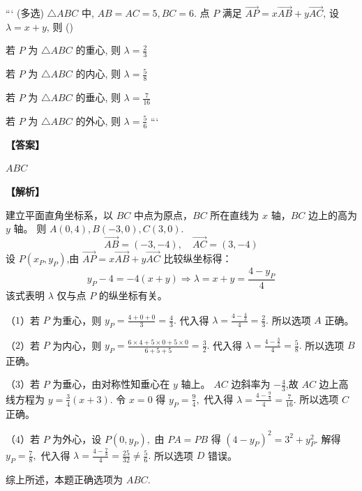 \documentclass{exam-zh}
\newenvironment{answer}{\par\vspace{0.5em}\noindent\textbf{【答案】}\par}{\par\vspace{1em}}
\newenvironment{solutions}{\par\vspace{0.5em}\noindent\textbf{【解析】}\par}{\par\vspace{1em}}\usepackage{lastpage}
\begin{document}

\begin{question}
```
(多选) $\triangle ABC$ 中, $AB=AC=5, BC=6$. 点 $P$ 满足 $\overrightarrow{AP}=x \overrightarrow{AB}+y \overrightarrow{AC}$, 设 $\lambda=x+y$, 则 (\hspace{1cm})
\begin{choices}
\item 若 $P$ 为 $\triangle ABC$ 的重心, 则 $\lambda=\frac{2}{3}$
\item 若 $P$ 为 $\triangle ABC$ 的内心, 则 $\lambda=\frac{5}{8}$
\item 若 $P$ 为 $\triangle ABC$ 的垂心, 则 $\lambda=\frac{7}{16}$
\item 若 $P$ 为 $\triangle ABC$ 的外心, 则 $\lambda=\frac{5}{6}$
```
\end{choices}
\end{question}

\begin{answer}
$ABC$
\end{answer}

\begin{solutions}
建立平面直角坐标系，以 $BC$ 中点为原点，$BC$ 所在直线为 $x$ 轴，$BC$ 边上的高为 $y$ 轴。
则 $A(0,4), B(-3,0), C(3,0)$.
$$
\overrightarrow{AB}=(-3,-4), \quad \overrightarrow{AC}=(3,-4)
$$
设 $P(x_P,y_P)$,由 $\overrightarrow{AP}=x \overrightarrow{AB}+y \overrightarrow{AC}$ 比较纵坐标得：
$$
y_P-4=-4(x+y) \Rightarrow \lambda=x+y=\frac{4-y_P}{4}
$$
该式表明 $\lambda$ 仅与点 $P$ 的纵坐标有关。

（$1$）若 $P$ 为重心，则 $y_P=\displaystyle\frac{4+0+0}{3}=\displaystyle\frac{4}{3}.$
代入得 $\lambda=\displaystyle\frac{4-\frac{4}{3}}{4}=\displaystyle\frac{2}{3}.$ 所以选项 $A$ 正确。

（$2$）若 $P$ 为内心，则 $y_P=\displaystyle\frac{6\times 4+5\times 0+5\times 0}{6+5+5}=\displaystyle\frac{3}{2}.$
代入得 $\lambda=\displaystyle\frac{4-\frac{3}{2}}{4}=\displaystyle\frac{5}{8}.$ 所以选项 $B$ 正确。

（$3$）若 $P$ 为垂心，由对称性知垂心在 $y$ 轴上。
$AC$ 边斜率为 $-\displaystyle\frac{4}{3}$,故 $AC$ 边上高线方程为 $y=\displaystyle\frac{3}{4}(x+3).$
令 $x=0$ 得 $y_P=\displaystyle\frac{9}{4},$ 代入得 $\lambda=\displaystyle\frac{4-\frac{9}{4}}{4}=\displaystyle\frac{7}{16}.$ 所以选项 $C$ 正确。

（$4$）若 $P$ 为外心，设 $P(0,y_P),$ 由 $PA=PB$ 得 $(4-y_P)^2=3^2+y_P^2.$
解得 $y_P=\displaystyle\frac{7}{8},$ 代入得 $\lambda=\displaystyle\frac{4-\frac{7}{8}}{4}=\displaystyle\frac{25}{32}\neq\displaystyle\frac{5}{6}.$ 所以选项 $D$ 错误。

综上所述，本题正确选项为 $ABC.$ 
\end{solutions}
\end{document}
